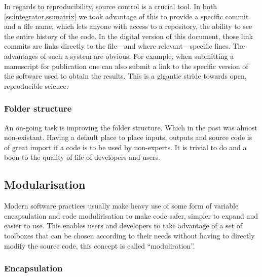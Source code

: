 In regards to reproducibility, source control is a crucial tool. In both \cref{ss:integrator,ss:matrix} we took advantage of this to provide a specific commit and a file name, which lets anyone with access to a repository, the ability to see the entire history of the code. In the digital version of this document, those link commits are links directly to the file---and where relevant---specific lines. The advantages of such a system are obvious. For example, when submitting a manuscript for publication one can also submit a link to the specific version of the software used to obtain the results. This is a gigantic stride towards open, reproducible science.

\subsubsection{Folder structure}

An on-going task is improving the folder structure. Which in the past was almost non-existant. Having a default place to place inputs, outputs and source code is of great import if a code is to be used by non-experts. It is trivial to do and a boon to the quality of life of developers and users.

\subsection{Modularisation}

Modern software practices usually make heavy use of some form of variable encapsulation and code modulirisation to make code safer, simpler to expand and easier to use. This enables users and developers to take advantage of a set of toolboxes that can be chosen according to their needs without having to directly modify the source code, this concept is called ``moduliration''.

\subsubsection{Encapsulation}

